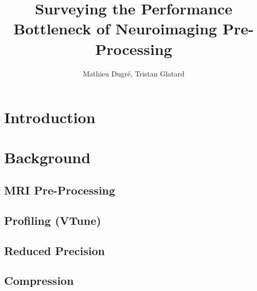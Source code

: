 \documentclass[conference,draft]{IEEEtran}
\title{Surveying the Performance Bottleneck of Neuroimaging Pre-Processing}
\author{Mathieu Dugr\'e, Tristan Glatard}
\begin{document}
\maketitle

\begin{abstract}
																											
\end{abstract}


\section{Introduction}



\section{Background}
\subsection{MRI Pre-Processing}


\subsection{Profiling (VTune)}


\subsection{Reduced Precision}

\subsection{Compression}
\end{document}
